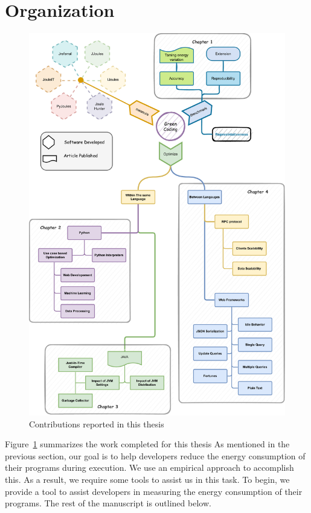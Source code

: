 \section{Organization}
\begin{figure}[!h]
      \centering
      \includegraphics[width=.7\textwidth,height=\textheight,keepaspectratio]{chapters/thesis_contributions.pdf}
      \caption{Contributions reported in this thesis}
      \label{fig:thesis_contributions}
\end{figure}

Figure~\ref{fig:thesis_contributions} summarizes the work completed for this thesis As mentioned in the previous section, our goal is to help developers reduce the energy consumption of their programs during execution.
We use an empirical approach to accomplish this.
As a result, we require some tools to assist us in this task.
To begin, we provide a tool to assist developers in measuring the energy consumption of their programs.
The rest of the manuscript is outlined below.

